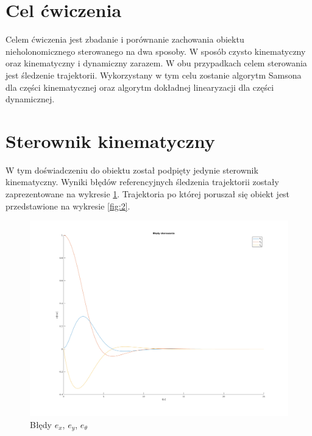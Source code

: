 \documentclass[12pt,a4paper]{article}
\begin{document}
\pdfpageheight   297mm
\pdfpagewidth    210mm

\StronaTytulowa
\SpisTresci

\pagebreak

\section{Cel ćwiczenia}
  Celem ćwiczenia jest zbadanie i porównanie zachowania obiektu nieholonomicznego sterowanego na dwa sposoby. W sposób czysto kinematyczny oraz kinematyczny i dynamiczny zarazem. W obu przypadkach celem sterowania jest śledzenie trajektorii. Wykorzystany w tym celu zostanie algorytm Samsona dla części kinematycznej oraz algorytm dokładnej linearyzacji dla części dynamicznej.







\section{Sterownik kinematyczny}
  W tym doświadczeniu do obiektu został podpięty jedynie sterownik kinematyczny. Wyniki błędów referencyjnych śledzenia trajektorii zostały zaprezentowane na wykresie \ref{fig:1}. Trajektoria po której poruszał się obiekt jest przedstawione na wykresie \ref{fig:2}.

  \begin{figure}[H]
    \centering
    \includegraphics[width=1\textwidth]{figures/kin_bledy.png}
    \caption{Błędy $e_x$, $e_y$, $e_\theta$}
    \label{fig:1}
  \end{figure}
\end{document}
